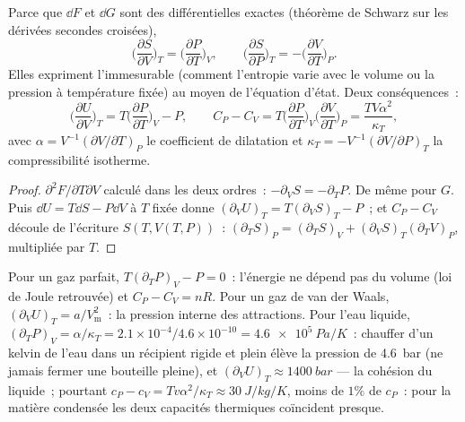 \begin{theorem}\label{thm:b2:thermodynamic-potentials:maxwell}
Parce que $\dd F$ et $\dd G$ sont des différentielles exactes (théorème de Schwarz
sur les dérivées secondes croisées),
\[
\Big(\frac{\partial S}{\partial V}\Big)_T = \Big(\frac{\partial P}{\partial T}\Big)_V,
\qquad
\Big(\frac{\partial S}{\partial P}\Big)_T = -\Big(\frac{\partial V}{\partial T}\Big)_P .
\]
Elles expriment l'immesurable (comment l'entropie varie avec le volume ou la
pression à température fixée) au moyen de l'équation d'état. Deux
conséquences~:
\[
\Big(\frac{\partial U}{\partial V}\Big)_T = T\Big(\frac{\partial P}{\partial T}\Big)_V - P,
\qquad
C_P - C_V = T\Big(\frac{\partial P}{\partial T}\Big)_V\Big(\frac{\partial V}{\partial T}\Big)_P
= \frac{TV\alpha^2}{\kappa_T} ,
\]
avec $\alpha = V^{-1}(\partial V/\partial T)_P$ le coefficient de dilatation et
$\kappa_T = -V^{-1}(\partial V/\partial P)_T$ la compressibilité isotherme.
\end{theorem}

\begin{proof}
$\partial^2F/\partial T\partial V$ calculé dans les deux ordres~: $-\partial_VS =
-\partial_TP$. De même pour $G$. Puis $\dd U = T\dd S - P\dd V$ à $T$ fixée
donne $(\partial_VU)_T = T(\partial_VS)_T - P$~; et $C_P - C_V$ découle
de l'écriture $S(T,V(T,P))$~: $(\partial_TS)_P = (\partial_TS)_V +
(\partial_VS)_T(\partial_TV)_P$, multipliée par $T$.
\end{proof}

\begin{example}\label{ex:b2:thermodynamic-potentials:reveal}
Pour un gaz parfait, $T(\partial_TP)_V - P = 0$~: l'énergie ne dépend pas
du volume (loi de Joule retrouvée) et $C_P - C_V = nR$. Pour un gaz de van
der Waals, $(\partial_VU)_T = a/V_{\text{m}}^2$~: la pression interne des
attractions. Pour l'eau liquide, $(\partial_TP)_V = \alpha/\kappa_T = 2.1
\times 10^{-4}/4.6 \times 10^{-10} = \qty{4.6e5}{Pa/K}$~: chauffer d'un kelvin de l'eau dans un
récipient rigide et plein élève la pression de \qty{4.6}{bar}
(ne jamais fermer une bouteille pleine), et $(\partial_VU)_T \approx \qty{1400}{bar}$ ---
la cohésion du liquide~; pourtant $c_P - c_V = Tv\alpha^2/\kappa_T \approx
\qty{30}{J/kg/K}$, moins de $1\%$ de $c_P$~: pour la matière condensée les deux
capacités thermiques coïncident presque.
\end{example}

